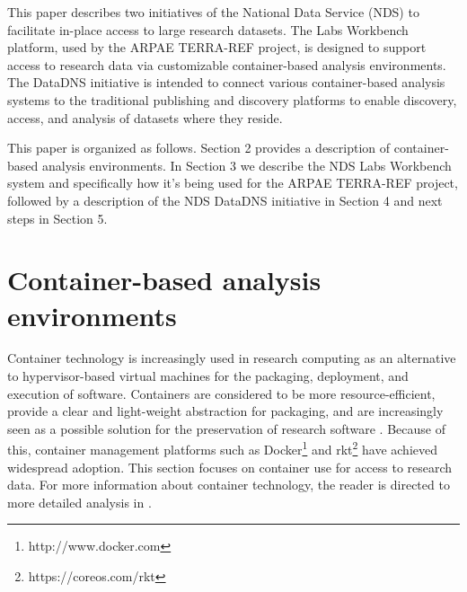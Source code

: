 \documentclass{sig-alternate}
\begin{document}
This paper describes two initiatives of the National Data Service (NDS) to facilitate in-place access to large research datasets. The Labs Workbench platform, used by the ARPAE TERRA-REF project, is designed to support access to research data via customizable container-based analysis environments.  The DataDNS initiative is intended to connect various container-based analysis systems to the traditional publishing and discovery platforms to enable discovery, access, and analysis of datasets where they reside.




This paper is organized as follows.  Section 2 provides a description of container-based analysis environments.  In Section 3 we describe the NDS Labs Workbench system and specifically how it's being used for the ARPAE TERRA-REF project, followed by a description of the NDS DataDNS initiative in Section 4 and next steps in Section 5.



\section{Container-based analysis environments}

Container technology is increasingly used in research computing as an alternative to hypervisor-based virtual machines for the packaging, deployment, and execution of software. Containers are considered to be more resource-efficient, provide a clear and light-weight abstraction for packaging, and are increasingly seen as a possible solution for the preservation of research software \cite{Meng2015137}.  Because of this, container management platforms such as Docker\footnote{http://www.docker.com} and rkt\footnote{https://coreos.com/rkt} have achieved widespread adoption. This section focuses on container use for access to research data. For more information about container technology, the reader is directed to more detailed analysis in \cite{7036275,7095802,Soltesz:2007:COS:1272998.1273025}. 
\end{document}
